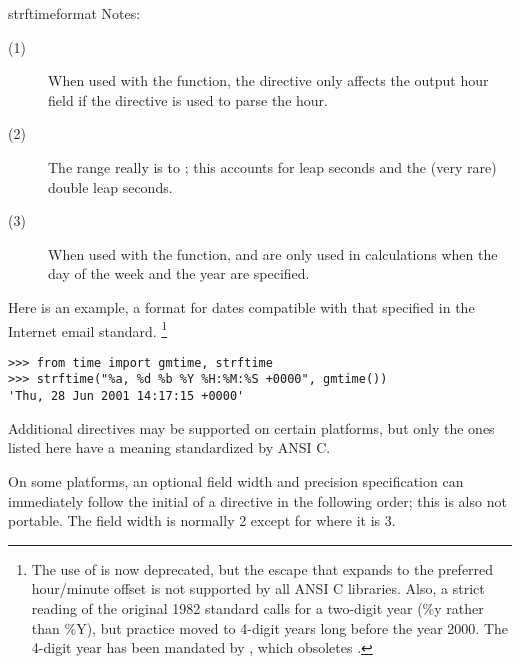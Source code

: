 \begin{funcdesc}{strftime}{format}
\noindent
Notes:

\begin{description}
  \item[(1)]
    When used with the  function, the 
    directive only affects the output hour field if the  directive
    is used to parse the hour.
  \item[(2)]
    The range really is  to ; this accounts for leap
    seconds and the (very rare) double leap seconds.
  \item[(3)]
    When used with the  function,  and 
    are only used in calculations when the day of the week and the year are
    specified.
\end{description}

Here is an example, a format for dates compatible with that specified 
in the  Internet email standard.
	\footnote{The use of  is now
	deprecated, but the  escape that expands to the preferred 
	hour/minute offset is not supported by all ANSI C libraries. Also,
	a strict reading of the original 1982  standard calls for
	a two-digit year (\%y rather than \%Y), but practice moved to
	4-digit years long before the year 2000.  The 4-digit year has
        been mandated by , which obsoletes .}

\begin{verbatim}
>>> from time import gmtime, strftime
>>> strftime("%a, %d %b %Y %H:%M:%S +0000", gmtime())
'Thu, 28 Jun 2001 14:17:15 +0000'
\end{verbatim}

Additional directives may be supported on certain platforms, but
only the ones listed here have a meaning standardized by ANSI C.

On some platforms, an optional field width and precision
specification can immediately follow the initial \character{\%} of a
directive in the following order; this is also not portable.
The field width is normally 2 except for  where it is 3.
\end{funcdesc}

